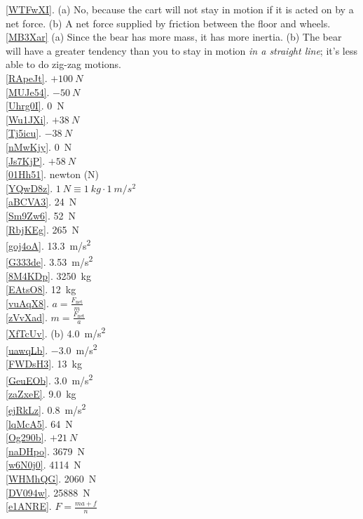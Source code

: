 \documentclass[main.tex]{subfiles}
\begin{document}
\begin{multicols}{2}
\ref{WTFwXI}. (a) No, because the cart will not stay in motion if it is acted on by a net force. (b) A net force supplied by friction between the floor and wheels.\\
\ref{MB3Xar} (a) Since the bear has more mass, it has more inertia. (b) The bear will have a greater tendency than you to stay in motion \textit{in a straight line}; it's less able to do zig-zag motions.\\
\ref{RApeJt}. $+\SI{100}{N}$\\
\ref{MUJe54}. $-\SI{50}{N}$\\
\ref{Uhrg0I}. \SI{0}{N}\\
\ref{Wu1JXi}. $+\SI{38}{N}$\\
\ref{Tj5icu}. $-\SI{38}{N}$\\
\ref{nMwKjy}. \SI{0}{N}\\
\ref{Js7KjP}. $+\SI{58}{N}$\\
\ref{01Hh51}. newton (N)\\
\ref{YQwD8z}. $\SI{1}{N} \equiv \SI{1}{kg} \cdot \SI{1}{m/s^2}$\\
\ref{aBCVA3}. \SI{24}{N}\\
\ref{Sm9Zw6}. \SI{52}{N}\\
\ref{RbjKEg}. \SI{265}{N}\\
\ref{goj4oA}. \SI{13.3}{m/s^2}\\
\ref{G333de}. \SI{3.53}{m/s^2}\\
\ref{8M4KDp}. \SI{3250}{kg}\\
\ref{EAtsO8}. \SI{12}{kg}\\
\ref{vuAqX8}. $a = \frac{F_{\text{net}}}{m}$\\
\ref{zVvXad}. $m = \frac{F_{\text{net}}}{a}$\\
\ref{XfTcUv}. (b) \SI{4.0}{m/s^2}\\
\ref{uawqLb}. \SI{-3.0}{m/s^2}\\
\ref{FWDsH3}. \SI{13}{kg}\\
\ref{GeuEOb}. \SI{3.0}{m/s^2}\\
\ref{zaZxeE}. \SI{9.0}{kg}\\
\ref{ejRkLz}. \SI{0.8}{m/s^2}\\
\ref{lqMcA5}. \SI{64}{N}\\
\ref{Og290b}. $+\SI{21}{N}$\\
\ref{naDHpo}. \SI{3679}{N}\\
\ref{w6N0j0}. \SI{4114}{N}\\
\ref{WHMhQG}. \SI{2060}{N}\\
\ref{DV094w}. \SI{25888}{N}\\
\ref{e1ANRE}. $F = \frac{ma + f}{n}$\\





\end{multicols}
\end{document}
